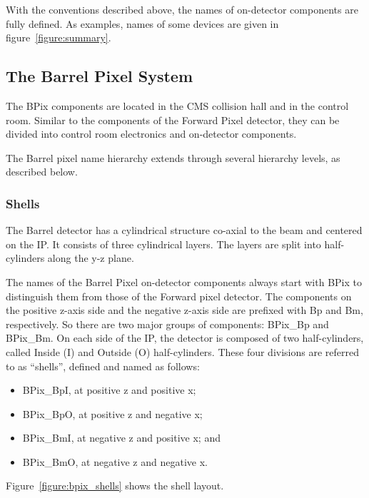 \documentclass{cmspaper}
\begin{document}
With the conventions described above, 
the names of on-detector components are fully defined.
As examples, names of some devices are given in figure~\ref{figure:summary}. 


\subsection{The Barrel Pixel System}

The BPix components are located in the CMS collision hall and in the control room. 
Similar to the components of the Forward Pixel detector,
they can be divided into control room electronics and on-detector components.

The Barrel pixel name hierarchy extends through several hierarchy levels, as described below.
%


\subsubsection{Shells}

The Barrel detector has a cylindrical structure co-axial to the beam and 
centered on the IP. It consists of three cylindrical layers. 
The layers are split into half-cylinders along the y-z plane.

The names of the Barrel Pixel on-detector components always start with 
BPix to distinguish them from those of the Forward pixel detector. 
The components on
the positive z-axis side and the negative z-axis side are prefixed with Bp 
and Bm, respectively. So there are 
two major groups of components: BPix\_Bp  and 
BPix\_Bm. On each side of the IP, the detector is composed of 
two half-cylinders, called 
Inside (I) and Outside (O) half-cylinders.
These four divisions are referred
to as ``shells'', defined and named as follows:
\begin{itemize}
\item  BPix\_BpI, at positive z and positive x; 
\item  BPix\_BpO, at positive z and negative x;
\item  BPix\_BmI, at negative z and positive x; and
\item  BPix\_BmO, at negative z and negative x.
\end{itemize}

Figure~\ref{figure:bpix_shells} shows the shell layout.
\end{document}
